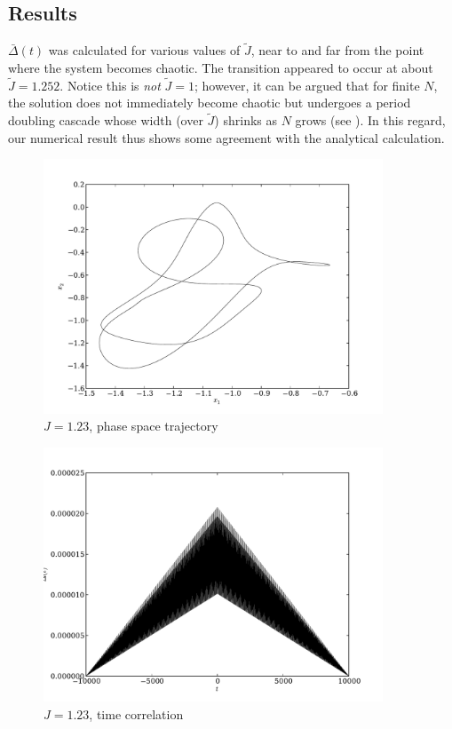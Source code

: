 \documentclass{article} %
\begin{document}
\subsection{Results}
$\bar{\Delta}(t)$ was calculated for various values of $\tilde{J}$, near to and far from the point where the system becomes chaotic.  The transition appeared to occur at about $\tilde{J} = 1.252$.  Notice this is \emph{not} $\tilde{J}=1$; however, it can be argued that for finite $N$, the solution does not immediately become chaotic but undergoes a period doubling cascade whose width (over $\tilde{J}$) shrinks as $N$ grows (see \cite{Sompolinsky1988}).  In this regard, our numerical result thus shows some agreement with the analytical calculation.

\begin{figure}[p]
	\centering
	\includegraphics[width=0.9\textwidth]{paul_figs/J_1_23}
	\caption{$J=1.23$, phase space trajectory}
	\label{fig:first_pstcorr}
\end{figure}
\begin{figure}[p]
	\centering
	\includegraphics[width=0.9\textwidth]{paul_figs/tcorr_J_1_23}
	\caption{$J=1.23$, time correlation}
\end{figure}
\end{document}
